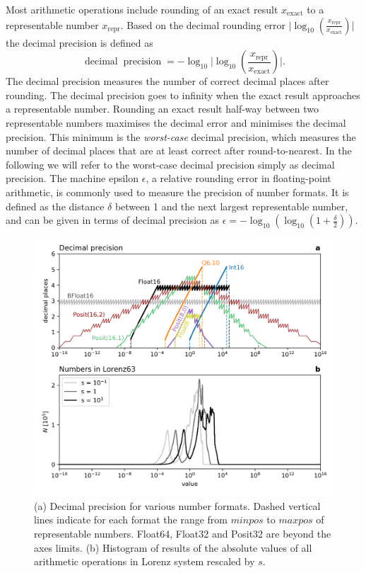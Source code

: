 \documentclass[draft]{agujournal2019}
\newcommand{\op}{\operatorname}
\begin{document}
Most arithmetic operations include rounding of an exact result $x_\text{exact}$
to a representable number $x_\text{repr}$. Based on the decimal rounding error
$\vert \log_{10}( \tfrac{x_\text{repr}}{x_\text{exact}} ) \vert$ the decimal precision
is defined as \cite{Gustafson2017, Klower2019a}
\begin{equation}
\op{decimal} \op{precision} = -\log_{10} \vert \log_{10}( \frac{x_\text{repr}}{x_\text{exact}} ) \vert.
\end{equation}
The decimal precision measures the number of correct decimal places after rounding.
The decimal precision goes to infinity when the exact result approaches a
representable number. Rounding an exact result half-way between two representable
numbers maximises the decimal error and minimises the decimal precision.
This minimum is the \emph{worst-case} decimal precision, which measures the number
of decimal places that are at least correct after round-to-nearest. In the following
we will refer to the worst-case decimal precision simply as decimal precision.
The machine epsilon $\epsilon$, a relative rounding error in floating-point arithmetic,
is commonly used to measure the precision of number formats. It is defined as the
distance $\delta$ between 1 and the next largest representable number, and can be
given in terms of decimal precision as $\epsilon = -\log_{10} ( \log_{10}( 1 + \tfrac{\delta}{2} ))$.

\begin{figure}[htbp]
\includegraphics[width=1\textwidth]{decimal_precision.png}
\caption{(a) Decimal precision for various number formats. Dashed vertical lines
indicate for each format the range from $minpos$ to $maxpos$ of representable numbers.
Float64, Float32 and Posit32 are beyond the axes limits. (b) Histogram of results
of the absolute values of all arithmetic operations in Lorenz system rescaled by $s$.}
\label{fig:dec_prec}
\end{figure}
\end{document}
